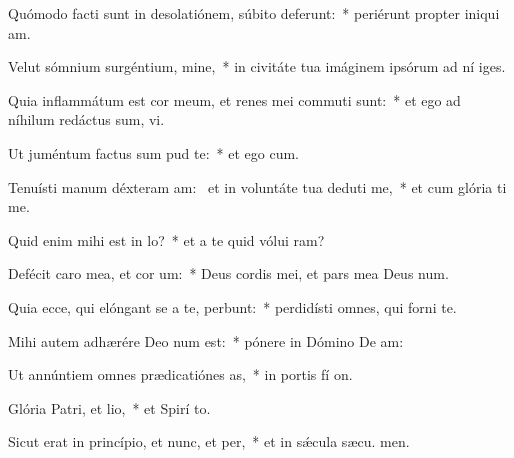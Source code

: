 \item Quómodo facti sunt in desolatiónem, súbito deferunt:~* periérunt propter iniqui am.
\item Velut sómnium surgéntium, mine,~* in civitáte tua imáginem ipsórum ad ní iges.
\item Quia inflammátum est cor meum, et renes mei commuti sunt:~* et ego ad níhilum redáctus sum,  vi.
\item Ut juméntum factus sum pud te:~* et ego  cum.
\item Tenuísti manum déxteram am:~\pscross{} et in voluntáte tua deduti me,~* et cum glória ti me.
\item Quid enim mihi est in lo?~* et a te quid vólui  ram?
\item Defécit caro mea, et cor um:~* Deus cordis mei, et pars mea Deus  num.
\item Quia ecce, qui elóngant se a te, perbunt:~* perdidísti omnes, qui forni  te.
\item Mihi autem adhærére Deo num est:~* pónere in Dómino De  am:
\item Ut annúntiem omnes prædicatiónes as,~* in portis fí on.
\item Glória Patri, et lio,~* et Spirí to.
\item Sicut erat in princípio, et nunc, et per,~* et in sǽcula sæcu. men.
